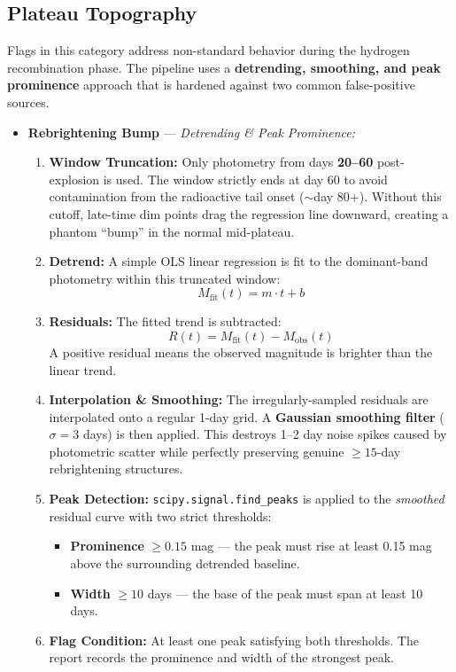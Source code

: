 \documentclass[11pt,a4paper]{article}
\begin{document}
\subsection*{Plateau Topography}
Flags in this category address non-standard behavior during the hydrogen recombination phase. The pipeline uses a \textbf{detrending, smoothing, and peak prominence} approach that is hardened against two common false-positive sources.
\begin{itemize}
    \item \textbf{Rebrightening Bump} --- \textit{Detrending \& Peak Prominence:}
    \begin{enumerate}
        \item \textbf{Window Truncation:} Only photometry from days \textbf{20--60} post-explosion is used. The window strictly ends at day 60 to avoid contamination from the radioactive tail onset ($\sim$day 80+). Without this cutoff, late-time dim points drag the regression line downward, creating a phantom ``bump'' in the normal mid-plateau.
        \item \textbf{Detrend:} A simple OLS linear regression is fit to the dominant-band photometry within this truncated window:
        $$M_{\text{fit}}(t) = m \cdot t + b$$
        \item \textbf{Residuals:} The fitted trend is subtracted:
        $$R(t) = M_{\text{fit}}(t) - M_{\text{obs}}(t)$$
        A positive residual means the observed magnitude is brighter than the linear trend.
        \item \textbf{Interpolation \& Smoothing:} The irregularly-sampled residuals are interpolated onto a regular 1-day grid. A \textbf{Gaussian smoothing filter} ($\sigma = 3$ days) is then applied. This destroys 1--2 day noise spikes caused by photometric scatter while perfectly preserving genuine $\ge 15$-day rebrightening structures.
        \item \textbf{Peak Detection:} \texttt{scipy.signal.find\_peaks} is applied to the \textit{smoothed} residual curve with two strict thresholds:
        \begin{itemize}
            \item \textbf{Prominence} $\ge 0.15$ mag --- the peak must rise at least 0.15 mag above the surrounding detrended baseline.
            \item \textbf{Width} $\ge 10$ days --- the base of the peak must span at least 10 days.
        \end{itemize}
        \item \textbf{Flag Condition:} At least one peak satisfying both thresholds. The report records the prominence and width of the strongest peak.
    \end{enumerate}


\end{itemize}
\end{document}
